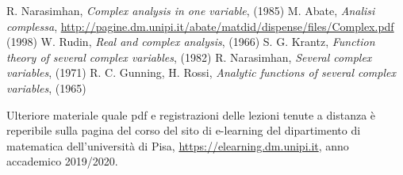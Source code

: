 \begin{thebibliography}{widest entry}
   R. Narasimhan, \textit{Complex analysis in one variable}, (1985)
   M. Abate, \textit{Analisi complessa}, \url{http://pagine.dm.unipi.it/abate/matdid/dispense/files/Complex.pdf} (1998)
   W. Rudin, \textit{Real and complex analysis}, (1966)
   S. G. Krantz, \textit{Function theory of several complex variables}, (1982)
   R. Narasimhan, \textit{Several complex variables}, (1971)
   R. C. Gunning, H. Rossi, \textit{Analytic functions of several complex variables}, (1965)
\end{thebibliography}

Ulteriore materiale quale pdf e registrazioni delle lezioni tenute a distanza è reperibile sulla pagina del corso del sito di e-learning del dipartimento di matematica dell'università di Pisa, \url{https://elearning.dm.unipi.it}, anno accademico 2019/2020.
